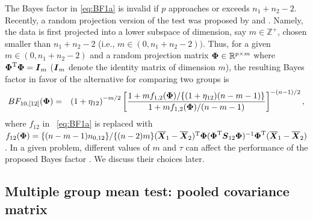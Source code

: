 \documentclass[APA,Times1COL]{WileyNJDv5} %
\def\be{\begin{eqnarray}}
\def\ee{\end{eqnarray}}
\def\trans{^{\rm T}}
\newcommand{\uI}       {\mbox{\boldmath$I$}}
\newcommand{\uS}       {\mbox{\boldmath$S$}}
\newcommand{\uX}       {\mbox{\boldmath$X$}}
\newcommand{\uPhi}              {\mbox{\boldmath$\Phi$}}
\begin{document}
The Bayes factor in \eqref{eq:BF1a} is invalid if $p$ approaches or exceeds $n_1 + n_2 - 2$. Recently, a random projection version of the test was proposed by \cite{srivastava2014raptt} and \cite{zoh2018powerful}. Namely, the data is first projected into a lower subspace of dimension, say $m \in \mathbb{Z}^{+}$, chosen smaller than $n_1 + n_2 -2$ (i.e., $m \in (0, n_1 + n_2 - 2))$. Thus, for a given $m \in (0, n_1 + n_2 - 2)$ and a random projection matrix $\uPhi \in \mathbb{R}^{p \times m}$ where $\uPhi\trans\uPhi = \uI_{m}$ ($\uI_{m}$ denote the identity matrix of dimension $m$), the resulting Bayes factor in favor of the alternative for comparing two groups is 
\be
BF_{10,[12]}(\uPhi) &=& \left(1 + \eta_{12} \right)^{-m/2} \left[\frac{  1 + {m f_{1,2}(\uPhi)}/\{(1 + \eta_{12})(n-m-1)\}}{ 1 + {m f_{1,2}(\uPhi)}/{(n-m-1)}  } \right]^{-(n-1)/2}, \label{eq:BF1}
\ee
where $f_{12}$ in ~\eqref{eq:BF1a} is replaced with $f_{12}(\uPhi) = \{(n-m-1)n_{0,12} \}/\{(n-2)m\} (\overline{\uX}_1 - \overline{\uX}_2)\trans\uPhi(\uPhi\trans\uS_{12}\uPhi)^{-1}\uPhi\trans(\overline{\uX}_1 - \overline{\uX}_2)$. 
In a given problem, different values of $m$ and $\tau$ can affect the performance of the proposed Bayes factor \citep{zoh2018powerful}. We discuss their choices later. 

\subsection{Multiple group mean test: pooled covariance matrix} \label{sec:testpl}
\end{document}
